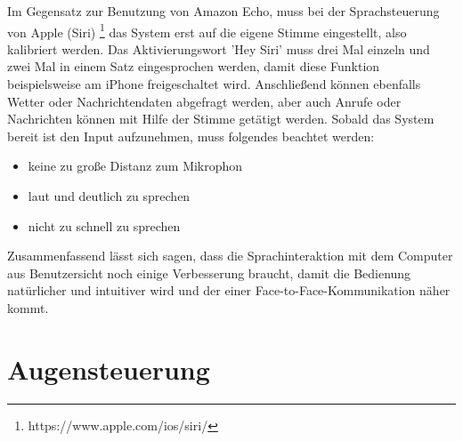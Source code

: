 Im Gegensatz zur Benutzung von Amazon Echo, muss bei der Sprachsteuerung von Apple (Siri)%
\footnote{https://www.apple.com/ios/siri/}
%
 das System erst auf die eigene Stimme eingestellt, also kalibriert werden. Das Aktivierungswort 'Hey Siri' muss drei Mal einzeln und zwei Mal in einem Satz eingesprochen werden, damit diese Funktion beispielsweise am iPhone freigeschaltet wird. Anschließend können ebenfalls Wetter oder Nachrichtendaten abgefragt werden, aber auch Anrufe oder Nachrichten können mit Hilfe der Stimme getätigt werden. 
\newline \newline
Sobald das System bereit ist den Input aufzunehmen, muss folgendes beachtet werden:
\begin{itemize}
      \item keine zu große Distanz zum Mikrophon
      \item laut und deutlich zu sprechen
			\item nicht zu schnell zu sprechen
\end{itemize}
\vspace{\baselineskip}
Zusammenfassend lässt sich sagen, dass die Sprachinteraktion mit dem Computer aus Benutzersicht noch einige Verbesserung braucht, damit die Bedienung natürlicher und intuitiver wird und der einer Face-to-Face-Kommunikation näher kommt.

\section{Augensteuerung}
\label{cha:Augensteuerung}

